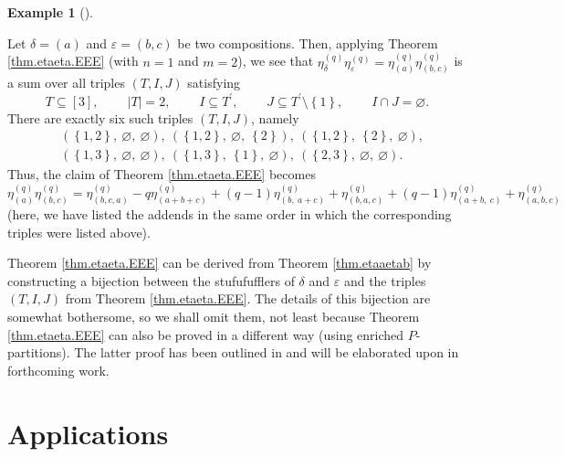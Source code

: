 \documentclass[numbers=enddot,12pt,final,onecolumn,notitlepage]{scrartcl}%
\theoremstyle{definition}
\newtheorem{exam}[theo]{Example}
\newenvironment{example}[1][]
{\begin{exam}[#1]\begin{leftbar}}
{\end{leftbar}\end{exam}}
\begin{document}
\begin{example}
Let $\delta=\left(  a\right)  $ and $\varepsilon=\left(  b,c\right)  $ be two
compositions. Then, applying Theorem \ref{thm.etaeta.EEE} (with $n=1$ and
$m=2$), we see that $\eta_{\delta}^{(q)}\eta_{\varepsilon}^{(q)}=\eta_{\left(
a\right)  }^{(q)}\eta_{\left(  b,c\right)  }^{(q)}$ is a sum over all triples
$\left(  T,I,J\right)  $ satisfying%
\[
T\subseteq\left[  3\right]  ,\ \ \ \ \ \ \ \ \ \ \left\vert T\right\vert
=2,\ \ \ \ \ \ \ \ \ \ I\subseteq T^{\prime},\ \ \ \ \ \ \ \ \ \ J\subseteq
T^{\prime}\setminus\left\{  1\right\}  ,\ \ \ \ \ \ \ \ \ \ I\cap
J=\varnothing.
\]
There are exactly six such triples $\left(  T,I,J\right)  $, namely%
\begin{align*}
&  \left(  \left\{  1,2\right\}  ,\ \varnothing,\ \varnothing\right)
,\ \left(  \left\{  1,2\right\}  ,\ \varnothing,\ \left\{  2\right\}  \right)
,\ \left(  \left\{  1,2\right\}  ,\ \left\{  2\right\}  ,\ \varnothing\right)
,\\
&  \left(  \left\{  1,3\right\}  ,\ \varnothing,\ \varnothing\right)
,\ \left(  \left\{  1,3\right\}  ,\ \left\{  1\right\}  ,\ \varnothing\right)
,\ \left(  \left\{  2,3\right\}  ,\ \varnothing,\ \varnothing\right)  .
\end{align*}
Thus, the claim of Theorem \ref{thm.etaeta.EEE} becomes%
\[
\eta_{\left(  a\right)  }^{\left(  q\right)  }\eta_{\left(  b,c\right)
}^{\left(  q\right)  }=\eta_{\left(  b,c,a\right)  }^{\left(  q\right)
}-q\eta_{\left(  a+b+c\right)  }^{\left(  q\right)  }+\left(  q-1\right)
\eta_{\left(  b,\ a+c\right)  }^{\left(  q\right)  }+\eta_{\left(
b,a,c\right)  }^{\left(  q\right)  }+\left(  q-1\right)  \eta_{\left(
a+b,\ c\right)  }^{\left(  q\right)  }+\eta_{\left(  a,b,c\right)  }^{\left(
q\right)  }%
\]
(here, we have listed the addends in the same order in which the corresponding
triples were listed above).
\end{example}

Theorem \ref{thm.etaeta.EEE} can be derived from Theorem \ref{thm.etaaetab} by
constructing a bijection between the stufufufflers of $\delta$ and
$\varepsilon$ and the triples $\left(  T,I,J\right)  $ from Theorem
\ref{thm.etaeta.EEE}. The details of this bijection are somewhat bothersome,
so we shall omit them, not least because Theorem \ref{thm.etaeta.EEE} can also
be proved in a different way (using enriched $P$-partitions). The latter proof
has been outlined in \cite[Corollary 1]{GriVas22} and will be elaborated upon
in forthcoming work.


\section{\label{sec.app}Applications}
\end{document}
